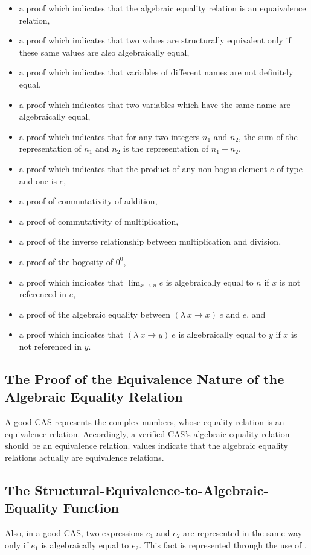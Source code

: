 \documentclass{report}
\begin{document}
\begin{itemize}
 \item a proof which indicates that the algebraic equality relation is an equaivalence relation,
 \item a proof which indicates that two values are structurally equivalent only if these same values are also algebraically equal,
 \item a proof which indicates that variables of different names are not definitely equal,
 \item a proof which indicates that two variables which have the same name are algebraically equal,
 \item a proof which indicates that for any two integers \(n_1\) and \(n_2\), the sum of the representation of \(n_1\) and \(n_2\) is the representation of \(n_1 + n_2\),
 \item a proof which indicates that the product of any non-bogus element \(e\) of type  and one is \(e\),
 \item a proof of commutativity of addition,
 \item a proof of commutativity of multiplication,
 \item a proof of the inverse relationship between multiplication and division,
 \item a proof of the bogosity of \(0^0\),
 \item a proof which indicates that \(\lim_{x \rightarrow n} e\) is algebraically equal to \(n\) if \(x\) is not referenced in \(e\),
 \item a proof of the algebraic equality between \(\left(\lambda\ x \rightarrow x\right)\ e\) and \(e\), and
 \item a proof which indicates that \(\left(\lambda\ x \rightarrow y\right)\ e\) is algebraically equal to \(y\) if \(x\) is not referenced in \(y\).
\end{itemize}

\subsection{The Proof of the Equivalence Nature of the Algebraic Equality Relation}
A good CAS represents the complex numbers, whose equality relation is an equivalence relation.  Accordingly, a verified CAS's algebraic equality relation should be an equivalence relation.   values indicate that the algebraic equality relations actually are equivalence relations.

\subsection{The Structural-Equivalence-to-Algebraic-Equality Function}
Also, in a good CAS, two expressions \(e_1\) and \(e_2\) are represented in the same way only if \(e_1\) is algebraically equal to \(e_2\).  This fact is represented through the use of .
\end{document}
